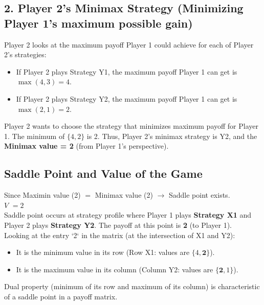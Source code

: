 \documentclass[../Main.tex]{subfiles}
\begin{document}
{\subsection*{2. Player 2's Minimax Strategy (Minimizing Player 1's maximum possible gain)}
Player 2 looks at the maximum payoff Player 1 could achieve for each of Player 2's strategies:
\begin{itemize}
    \item If Player 2 plays Strategy Y1, the maximum payoff Player 1 can get is $\max(4, 3) = 4$.
    \item If Player 2 plays Strategy Y2, the maximum payoff Player 1 can get is $\max(2, 1) = 2$.
\end{itemize}
Player 2 wants to choose the strategy that minimizes maximum payoff for Player 1. The minimum of $\{4, 2\}$ is 2.
Thus, Player 2's minimax strategy is Y2, and the \textbf{Minimax value = 2} (from Player 1's perspective).
}

\subsection*{Saddle Point and Value of the Game}
Since Maximin value (2) $=$ Minimax value (2) $\rightarrow$ Saddle point exists.\\

\textbf{$V$} $= 2$\\

Saddle point occurs at strategy profile where Player 1 plays \textbf{Strategy X1} and Player 2 plays \textbf{Strategy Y2}. The payoff at this point is \textbf{2} (to Player 1).\\

Looking at the entry `2` in the matrix (at the intersection of X1 and Y2):
\begin{itemize}
    \item It is the minimum value in its row (Row X1: values are $\{4, \mathbf{2}\}$).
    \item It is the maximum value in its column (Column Y2: values are $\{\mathbf{2}, 1\}$).
\end{itemize}
Dual property (minimum of its row and maximum of its column) is characteristic of a saddle point in a payoff matrix.
\end{document}
